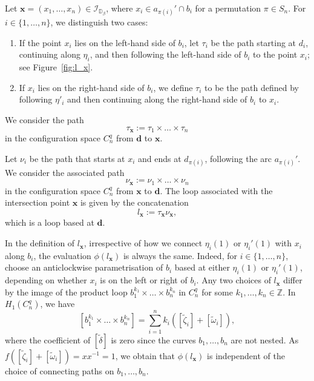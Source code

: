 \documentclass[11pt]{amsart}
\numberwithin{equation}{section}
\numberwithin{figure}{section}
\theoremstyle{definition}
\newcommand{\cI}{\mathcal{I}}
\newcommand{\bD}{\mathbb{D}}
\newcommand{\bZ}{\mathbb{Z}}
\newcommand{\ds}{\boldsymbol{d}}
\newcommand{\xs}{\boldsymbol{x}}
\begin{document}
\begin{defn}\label{def:loop}
Let $\xs=(x_1,\dots,x_n) \in \cI_{\bD_\beta}$, where $x_i \in a_{\pi(i)}' \cap b_i$ for a permutation $\pi \in S_n$. For $i \in \{1,\dots,n\}$, we distinguish two cases: 
\begin{enumerate}
    \item If the point $x_i$ lies on the left-hand side of $b_i$, let $\tau_i$ be the path starting at $d_i$, continuing along $\eta_i$, and then following the left-hand side of $b_i$ to the point $x_i$; see Figure~\ref{fig:l_x}.
    \item If $x_i$ lies on the right-hand side of $b_i$, we define $\tau_i$ to be the path defined by following $\eta'_i$ and then continuing along the right-hand side of $b_i$ to $x_i$.
\end{enumerate}
We consider the path
\begin{equation}
\tau_{\xs} := \tau_1 \times \dots \times \tau_n
\end{equation}
in the configuration space $C^q_n$ from $\ds$ to $\xs$.

Let $\nu_i$ be the path that starts at $x_i$ and ends at $d_{\pi(i)}$, following the arc $a_{\pi(i)}'$. We consider the associated path
\begin{equation}
\nu_{\xs} := \nu_1 \times \dots \times \nu_n 
\end{equation}
in the configuration space $C^q_n$ from $\xs$ to $\ds$. The loop associated with the intersection point $\xs$ is given by the concatenation  
\begin{equation}
l_{\xs} := \tau_{\xs} \nu_{\xs}, 
\end{equation}
which is a loop based at $\ds$.
\end{defn}

\begin{rmk}
    In the definition of $l_{\xs}$, irrespective of how we connect $\eta_i(1)$ or $\eta_i'(1)$ with $x_i$ along $b_i$, the evaluation $\phi(l_{\xs})$ is always the same. Indeed, for $i \in \{1,\dots,n\}$, choose an anticlockwise parametrisation of $b_i$ based at either $\eta_i(1)$ or $\eta_i'(1)$, depending on whether $x_i$ is on the left or right of $b_i$. Any two choices of $l_{\xs}$ differ by the image of the product loop $b_1^{k_1} \times \dots \times b_n^{k_n}$ in $C_n^q$ for some $k_1, \dots, k_n \in \bZ$. In $H_1(C_n^q)$, we have
    \[
    [b_1^{k_1} \times \dots \times b_n^{k_n}] = \sum_{i=1}^n k_i\left([\tilde{\zeta}_i] + [\tilde{\omega}_i] \right),
    \]
    where the coefficient of $[\tilde{\delta}]$ is zero since the curves $b_1,\dots,b_n$ are not nested. As $f([\tilde{\zeta}_i] + [\tilde{\omega}_i]) = xx^{-1} = 1$, we obtain that $\phi(l_{\xs})$ is independent of the choice of connecting paths on $b_1,\dots,b_n$.
\end{rmk}
\end{document}
